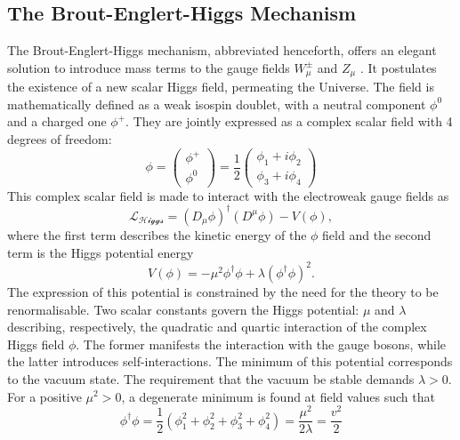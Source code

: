 \subsection{The Brout-Englert-Higgs Mechanism}
The Brout-Englert-Higgs mechanism, abbreviated  henceforth, offers an elegant solution to introduce mass terms to the gauge fields $W_{\mu}^{\pm}$ and $Z_{\mu}$ \cite{Englert:1964et,  PhysRevLett.13.508}. It postulates the existence of a new scalar Higgs field, permeating the Universe. The field is mathematically defined as a weak isospin doublet, with a neutral component $\phi^0$ and a charged one $\phi^+$. They are jointly expressed as a complex scalar field with 4 degrees of freedom:
\begin{equation}
\phi = \begin{pmatrix}
    \phi^+\\ 
    \phi^0
\end{pmatrix} = \frac{1}{2} \begin{pmatrix}
    \phi_1 + i\phi_2 \\ 
    \phi_3 + i\phi_4
\end{pmatrix}
\end{equation}
This complex scalar field is made to interact with the electroweak gauge fields as 
\begin{equation}\label{eq-HiggsLag}
    \mathcal{L_{\text{Higgs}}} = (D_{\mu}\phi)^{\dagger} (D^{\mu}\phi) - V(\phi),
 \end{equation}
where the first term describes the kinetic energy of the $\phi$ field and the second term is the Higgs potential energy
\begin{equation}\label{eq-HiggsPot}
 V(\phi) = - \mu^2  \phi^{\dagger} \phi + \lambda (\phi^{\dagger} \phi)^2.
\end{equation}
The expression of this potential is constrained by the need for the theory to be renormalisable. Two scalar constants govern the Higgs potential: $\mu$ and $\lambda$ describing, respectively, the quadratic and quartic interaction of the complex Higgs field $\phi$. The former manifests the interaction with the gauge bosons, while the latter introduces self-interactions. The minimum of this potential corresponds to the vacuum state. The requirement that the vacuum be stable demands $\lambda > 0$. For a positive $\mu^2 > 0$, a degenerate minimum is found at field values such that
\begin{equation}\label{eq-HiggsVacEq}
    \phi^{\dagger} \phi  = \frac{1}{2} (\phi_1^2 + \phi_2^2 + \phi_3^2 + \phi_4^2) = \frac{\mu^2}{2\lambda} = \frac{v^2}{2}
\end{equation}
